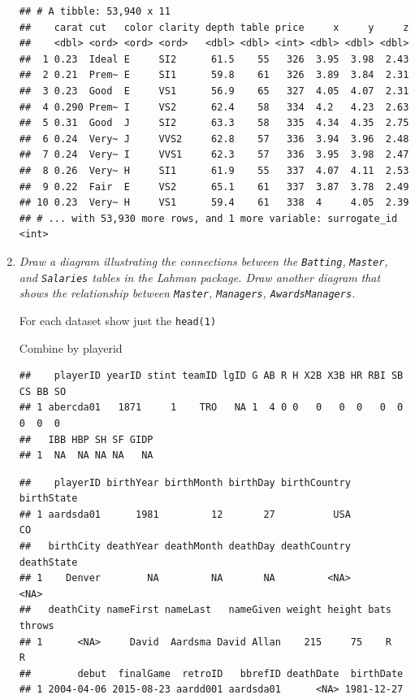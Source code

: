 \documentclass[]{book}
\newenvironment{Shaded}{\begin{snugshade}}{\end{snugshade}}
\newcommand{\DataTypeTok}[1]{\textcolor[rgb]{0.13,0.29,0.53}{#1}}
\newcommand{\KeywordTok}[1]{\textcolor[rgb]{0.13,0.29,0.53}{\textbf{#1}}}
\newcommand{\NormalTok}[1]{#1}
\newcommand{\OperatorTok}[1]{\textcolor[rgb]{0.81,0.36,0.00}{\textbf{#1}}}
\newcommand{\StringTok}[1]{\textcolor[rgb]{0.31,0.60,0.02}{#1}}
\theoremstyle{definition}
\theoremstyle{definition}
\theoremstyle{definition}
\theoremstyle{remark}
\begin{document}
\begin{enumerate}
\begin{Shaded}
\end{Shaded}

\begin{verbatim}
## # A tibble: 53,940 x 11
##    carat cut   color clarity depth table price     x     y     z
##    <dbl> <ord> <ord> <ord>   <dbl> <dbl> <int> <dbl> <dbl> <dbl>
##  1 0.23  Ideal E     SI2      61.5    55   326  3.95  3.98  2.43
##  2 0.21  Prem~ E     SI1      59.8    61   326  3.89  3.84  2.31
##  3 0.23  Good  E     VS1      56.9    65   327  4.05  4.07  2.31
##  4 0.290 Prem~ I     VS2      62.4    58   334  4.2   4.23  2.63
##  5 0.31  Good  J     SI2      63.3    58   335  4.34  4.35  2.75
##  6 0.24  Very~ J     VVS2     62.8    57   336  3.94  3.96  2.48
##  7 0.24  Very~ I     VVS1     62.3    57   336  3.95  3.98  2.47
##  8 0.26  Very~ H     SI1      61.9    55   337  4.07  4.11  2.53
##  9 0.22  Fair  E     VS2      65.1    61   337  3.87  3.78  2.49
## 10 0.23  Very~ H     VS1      59.4    61   338  4     4.05  2.39
## # ... with 53,930 more rows, and 1 more variable: surrogate_id <int>
\end{verbatim}
\item
  \emph{Draw a diagram illustrating the connections between the
  \texttt{Batting},} \emph{\texttt{Master}, and \texttt{Salaries} tables
  in the Lahman package. Draw another diagram} \emph{that shows the
  relationship between \texttt{Master}, \texttt{Managers},
  \texttt{AwardsManagers}.}

  For each dataset show just the \texttt{head(1)}

  Combine by playerid

\begin{verbatim}
##    playerID yearID stint teamID lgID G AB R H X2B X3B HR RBI SB CS BB SO
## 1 abercda01   1871     1    TRO   NA 1  4 0 0   0   0  0   0  0  0  0  0
##   IBB HBP SH SF GIDP
## 1  NA  NA NA NA   NA
\end{verbatim}

\begin{verbatim}
##    playerID birthYear birthMonth birthDay birthCountry birthState
## 1 aardsda01      1981         12       27          USA         CO
##   birthCity deathYear deathMonth deathDay deathCountry deathState
## 1    Denver        NA         NA       NA         <NA>       <NA>
##   deathCity nameFirst nameLast   nameGiven weight height bats throws
## 1      <NA>     David  Aardsma David Allan    215     75    R      R
##        debut  finalGame  retroID   bbrefID deathDate  birthDate
## 1 2004-04-06 2015-08-23 aardd001 aardsda01      <NA> 1981-12-27
\end{verbatim}


\end{enumerate}
\end{document}
